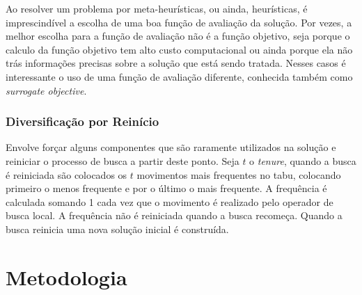 \documentclass[12pt,a4paper]{article}
\begin{document}
        Ao resolver um problema por meta-heurísticas, ou ainda, heurísticas, é imprescindível a escolha de uma boa função de avaliação da solução. Por vezes, a melhor escolha para a função de
        avaliação não é a função objetivo, seja porque o calculo da função objetivo tem alto custo computacional ou ainda porque ela não trás informações precisas sobre a solução que está sendo
        tratada. Nesses casos é interessante o uso de uma função de avaliação diferente, conhecida também como {\it surrogate objective}.



    \subsubsection{Diversificação por Reinício}

        Envolve forçar alguns componentes que são raramente utilizados na solução e reiniciar o processo de busca a partir deste ponto.  Seja $t$ o \textit{tenure}, quando a busca é
        reiniciada são colocados os $t$ movimentos mais frequentes no tabu, colocando primeiro o menos frequente e por o último o mais frequente. A frequência é calculada somando 1 cada vez
        que o movimento é realizado pelo operador de busca local. A frequência não é reiniciada quando a busca recomeça. Quando a busca reinicia uma nova solução inicial é construída.


\section{Metodologia}


\printbibliography
\end{document}
